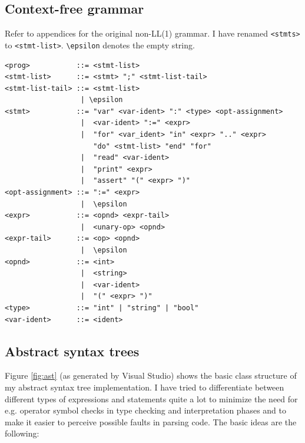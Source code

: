 \documentclass[a4paper,11pt]{article}
\begin{document}
\subsection{Context-free grammar}

Refer to appendices for the original non-LL(1) grammar. I have renamed \verb,<stmts>, to \verb,<stmt-list>,. \verb,\epsilon, denotes the empty string.

\newpage

\begin{verbatim}
<prog>           ::= <stmt-list>
<stmt-list>      ::= <stmt> ";" <stmt-list-tail>
<stmt-list-tail> ::= <stmt-list>
                  | \epsilon
<stmt>           ::= "var" <var-ident> ":" <type> <opt-assignment>
                  |  <var-ident> ":=" <expr>
                  |  "for" <var_ident> "in" <expr> ".." <expr>
                     "do" <stmt-list> "end" "for"
                  |  "read" <var-ident>
                  |  "print" <expr>
                  |  "assert" "(" <expr> ")"
<opt-assignment> ::= ":=" <expr>
                  |  \epsilon
<expr>           ::= <opnd> <expr-tail>
                  |  <unary-op> <opnd>
<expr-tail>      ::= <op> <opnd>
                  |  \epsilon
<opnd>           ::= <int>
                  |  <string>
                  |  <var-ident>
                  |  "(" <expr> ")"
<type>           ::= "int" | "string" | "bool"
<var-ident>      ::= <ident>
\end{verbatim}

\subsection{Abstract syntax trees}

Figure \ref{fig:ast} (as generated by Visual Studio) shows the basic class structure of my abstract syntax tree implementation. I have tried to differentiate between different types of expressions and statements quite a lot to minimize the need for e.g. operator symbol checks in type checking and interpretation phases and to make it easier to perceive possible faults in parsing code. The basic ideas are the following:
\end{document}
